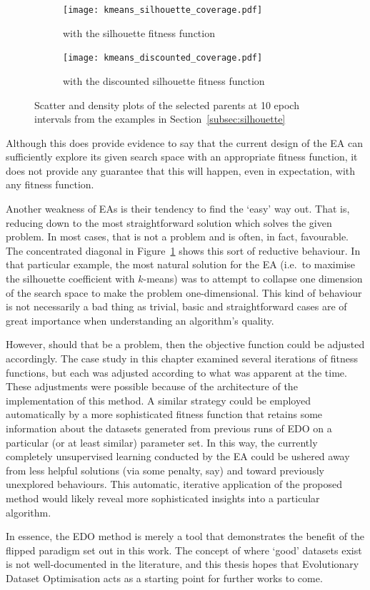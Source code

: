 \begin{figure}[htbp]
    \centering
    \begin{subfigure}{\imgwidth}
        \texttt{[image: kmeans\_silhouette\_coverage.pdf]}
        \caption{%
            with the silhouette fitness function%
        }\label{fig:silhouette_coverage}
    \end{subfigure}

    \vspace{1em}
    \begin{subfigure}{\imgwidth}
        \texttt{[image: kmeans\_discounted\_coverage.pdf]}
        \caption{with the discounted silhouette fitness function}
    \end{subfigure}
    \caption{%
        Scatter and density plots of the selected parents at 10 epoch
        intervals from the examples in Section~\ref{subsec:silhouette}
    }\label{fig:coverage}
\end{figure}

Although this does provide evidence to say that the current design of the EA can
sufficiently explore its given search space with an appropriate fitness
function, it does not provide any guarantee that this will happen, even in
expectation, with any fitness function.

Another weakness of EAs is their tendency to find the `easy' way out. That is,
reducing down to the most straightforward solution which solves the given
problem. In most cases, that is not a problem and is often, in fact, favourable.
The concentrated diagonal in Figure~\ref{fig:silhouette_coverage} shows this
sort of reductive behaviour. In that particular example, the most natural
solution for the EA (i.e.\ to maximise the silhouette coefficient with
\(k\)-means) was to attempt to collapse one dimension of the search space to
make the problem one-dimensional. This kind of behaviour is not necessarily a
bad thing as trivial, basic and straightforward cases are of great importance
when understanding an algorithm's quality.

However, should that be a problem, then the objective function could be adjusted
accordingly. The case study in this chapter examined several iterations of
fitness functions, but each was adjusted according to what was apparent at the
time. These adjustments were possible because of the architecture of the
implementation of this method. A similar strategy could be employed
automatically by a more sophisticated fitness function that retains some
information about the datasets generated from previous runs of EDO on a
particular (or at least similar) parameter set. In this way, the currently
completely unsupervised learning conducted by the EA could be ushered away from
less helpful solutions (via some penalty, say) and toward previously unexplored
behaviours. This automatic, iterative application of the proposed method would
likely reveal more sophisticated insights into a particular algorithm.

In essence, the EDO method is merely a tool that demonstrates the benefit of the
flipped paradigm set out in this work. The concept of where `good' datasets
exist is not well-documented in the literature, and this thesis hopes that
Evolutionary Dataset Optimisation acts as a starting point for further works to
come.
